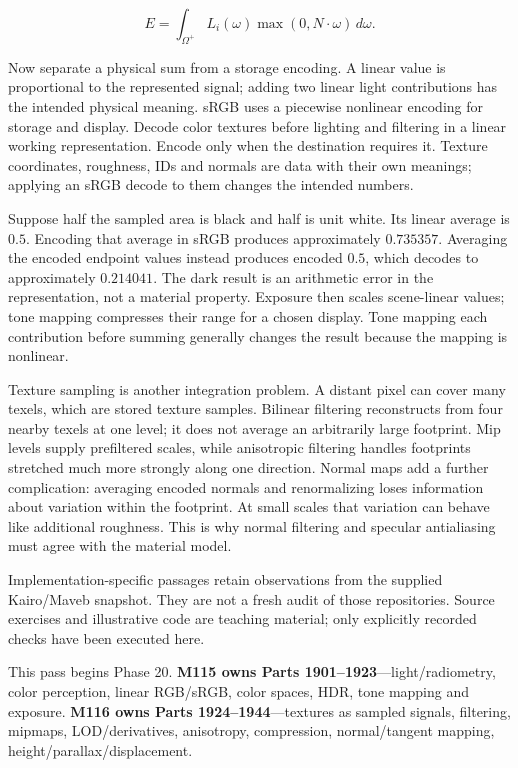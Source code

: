 \[
E=\int_{\Omega^+}L_i(\omega)\max(0,N\cdot\omega)\,d\omega.
\]

Now separate a physical sum from a storage encoding. A linear value is proportional to the represented signal; adding two linear light contributions has the intended physical meaning. sRGB uses a piecewise nonlinear encoding for storage and display. Decode color textures before lighting and filtering in a linear working representation. Encode only when the destination requires it. Texture coordinates, roughness, IDs and normals are data with their own meanings; applying an sRGB decode to them changes the intended numbers.

Suppose half the sampled area is black and half is unit white. Its linear average is \(0.5\). Encoding that average in sRGB produces approximately \(0.735357\). Averaging the encoded endpoint values instead produces encoded \(0.5\), which decodes to approximately \(0.214041\). The dark result is an arithmetic error in the representation, not a material property. Exposure then scales scene-linear values; tone mapping compresses their range for a chosen display. Tone mapping each contribution before summing generally changes the result because the mapping is nonlinear.

Texture sampling is another integration problem. A distant pixel can cover many texels, which are stored texture samples. Bilinear filtering reconstructs from four nearby texels at one level; it does not average an arbitrarily large footprint. Mip levels supply prefiltered scales, while anisotropic filtering handles footprints stretched much more strongly along one direction. Normal maps add a further complication: averaging encoded normals and renormalizing loses information about variation within the footprint. At small scales that variation can behave like additional roughness. This is why normal filtering and specular antialiasing must agree with the material model.

Implementation-specific passages retain observations from the supplied Kairo/Maveb snapshot. They are not a fresh audit of those repositories. Source exercises and illustrative code are teaching material; only explicitly recorded checks have been executed here.

This pass begins Phase 20. \textbf{M115 owns Parts 1901--1923}---light/radiometry, color perception, linear RGB/sRGB, color spaces, HDR, tone mapping and exposure. \textbf{M116 owns Parts 1924--1944}---textures as sampled signals, filtering, mipmaps, LOD/derivatives, anisotropy, compression, normal/tangent mapping, height/parallax/displacement.

